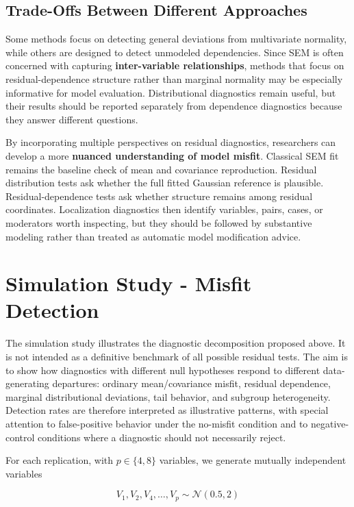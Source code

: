 \documentclass[floatsintext,a4paper]{apa7} %
\begin{document}
	\subsection{Trade-Offs Between Different Approaches}
	Some methods focus on detecting general deviations from multivariate normality, while others are designed to detect unmodeled dependencies. Since SEM is often concerned with capturing \textbf{inter-variable relationships}, methods that focus on residual-dependence structure rather than marginal normality may be especially informative for model evaluation. Distributional diagnostics remain useful, but their results should be reported separately from dependence diagnostics because they answer different questions.
	
	By incorporating multiple perspectives on residual diagnostics, researchers can develop a more \textbf{nuanced understanding of model misfit}. Classical SEM fit remains the baseline check of mean and covariance reproduction. Residual distribution tests ask whether the full fitted Gaussian reference is plausible. Residual-dependence tests ask whether structure remains among residual coordinates. Localization diagnostics then identify variables, pairs, cases, or moderators worth inspecting, but they should be followed by substantive modeling rather than treated as automatic model modification advice.
	
	
	
	
	
	\section{Simulation Study - Misfit Detection}
	
	The simulation study illustrates the diagnostic decomposition proposed above. It is not intended as a definitive benchmark of all possible residual tests. The aim is to show how diagnostics with different null hypotheses respond to different data-generating departures: ordinary mean/covariance misfit, residual dependence, marginal distributional deviations, tail behavior, and subgroup heterogeneity. Detection rates are therefore interpreted as illustrative patterns, with special attention to false-positive behavior under the no-misfit condition and to negative-control conditions where a diagnostic should not necessarily reject.
	
	For each replication, with $p\in\{4,8\}$ variables, we generate mutually independent variables
	
	$$
	V_1,V_2,V_4,\ldots,V_p \sim \mathcal{N}(0.5,2)
	$$
	
\end{document}
